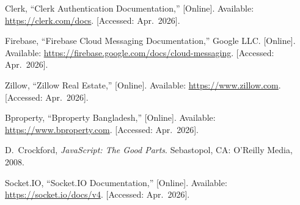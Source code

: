 \documentclass[12pt,a4paper]{report}
\begin{document}
\begin{enumerate}[
  label={[\arabic*]},
  leftmargin=0pt,
  labelwidth=2em,
  labelsep=0.3em,
  itemindent=2.31em,
  itemsep=0pt,
  parsep=6pt]
  \item Clerk, ``Clerk Authentication Documentation,'' [Online]. Available:
        \url{https://clerk.com/docs}. [Accessed: Apr.\ 2026].

  \item Firebase, ``Firebase Cloud Messaging Documentation,'' Google LLC. [Online]. Available:
        \url{https://firebase.google.com/docs/cloud-messaging}. [Accessed: Apr.\ 2026].

  \item Zillow, ``Zillow Real Estate,'' [Online]. Available:
        \url{https://www.zillow.com}. [Accessed: Apr.\ 2026].

  \item Bproperty, ``Bproperty Bangladesh,'' [Online]. Available:
        \url{https://www.bproperty.com}. [Accessed: Apr.\ 2026].

  \item D.~Crockford, \textit{JavaScript: The Good Parts}. Sebastopol, CA:
        O'Reilly Media, 2008.

  \item Socket.IO, ``Socket.IO Documentation,'' [Online]. Available:
        \url{https://socket.io/docs/v4}. [Accessed: Apr.\ 2026].

\end{enumerate}
\end{document}
